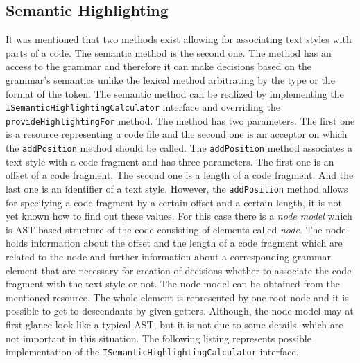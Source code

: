 \documentclass[12pt,notitlepage,a4paper]{report}
\begin{document}
\subsection {Semantic Highlighting}
\label{SemanticHighlighting}
It was mentioned that two methods exist allowing for associating text styles with parts of a code. The semantic method is the second one. The method has an access to the grammar and therefore it can make decisions based on the grammar's semantics unlike the lexical method arbitrating by the type or the format of the token.  The semantic method can be realized by implementing the \texttt{ISemanticHighlightingCalculator} interface and overriding the \texttt{provideHighlightingFor} method. The method has two parameters. The first one is a resource representing a code file and the second one is an acceptor on which the \texttt{addPosition} method should be called.  The \texttt{addPosition} method associates a text style with a code fragment and  has three parameters. The first one is an offset of a code fragment. The second one is a length of a code fragment. And the last one is an identifier of a text style. However, the \texttt{addPosition} method allows for specifying a code fragment by a certain offset and a certain length, it is not yet known how to find out these values. For this case there is a \textit{node model} which is AST-based structure of the code consisting of elements called \textit{node}. The node holds information about the offset and the length of a code fragment which are related to the node and further information about a corresponding grammar element that are necessary for creation of decisions whether to associate the code fragment with the text style or not. The node model can be obtained from the mentioned resource. The whole element is represented by one root node and it is possible to get to descendants by given getters. Although, the node model may at first glance look like a typical AST, but it is not due to some details, which are not important in this situation. The following listing represents possible implementation of the \texttt{ISemanticHighlightingCalculator} interface.
\end{document}
